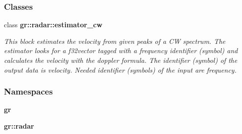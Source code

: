 \subsubsection*{Classes}
\begin{DoxyCompactItemize}
\item 
class {\bf gr\+::radar\+::estimator\+\_\+cw}
\begin{DoxyCompactList}\small\item\em This block estimates the velocity from given peaks of a CW spectrum. The estimator looks for a f32vector tagged with a \textquotesingle{}frequency\textquotesingle{} identifier (symbol) and calculates the velocity with the doppler formula. The identifier (symbol) of the output data is \textquotesingle{}velocity\textquotesingle{}. Needed identifier (symbols) of the input are \textquotesingle{}frequency\textquotesingle{}. \end{DoxyCompactList}\end{DoxyCompactItemize}
\subsubsection*{Namespaces}
\begin{DoxyCompactItemize}
\item 
 {\bf gr}
\item 
 {\bf gr\+::radar}
\end{DoxyCompactItemize}
